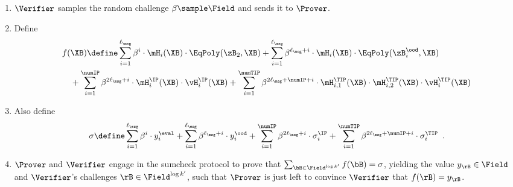 \begin{tcolorbox}[breakable, enhanced, colback=white, boxrule=0.65pt]
        \begin{enumerate}[nolistsep]
        \item $\Verifier$ samples the random challenge $\beta \sample \Field$ and sends it to $\Prover$.
        \item Define 
        \label{item:IOR-sumcheck-polynomial}
        \begin{align*}
            &f(\XB) \define \sum_{i=1}^{\ell_{\msg}} \beta^{i} \cdot \mH_i(\XB) \cdot \EqPoly(\zB_2, \XB) + \sum_{i=1}^{\ell_{\msg}} \beta^{\ell_{\msg} + i} \cdot \mH_i(\XB) \cdot \EqPoly(\zB^{\ood}_i, \XB) \\
            &\quad + \sum_{i=1}^{\numIP} \beta^{2\ell_{\msg} + i} \cdot \mH^{\IP}_i(\XB) \cdot \vH^{\IP}_i(\XB) + \sum_{i=1}^{\numTIP} \beta^{2\ell_{\msg} + \numIP + i} \cdot \mH^{\TIP}_{i,1}(\XB) \cdot \mH^{\TIP}_{i,2}(\XB) \cdot \vH^{\TIP}_i(\XB)
        \end{align*}
        \item Also define
        \label{item:IOR-sumcheck-value}
        \begin{align*}
            \sigma \define \sum_{i=1}^{\ell_{\msg}} \beta^{i} \cdot y^{\eval}_i + \sum_{i=1}^{\ell_{\msg}} \beta^{\ell_{\msg} + i} \cdot y^{\ood}_i + \sum_{i=1}^{\numIP} \beta^{2\ell_{\msg} + i} \cdot \sigma^{\IP}_i + \sum_{i=1}^{\numTIP} \beta^{2\ell_{\msg} + \numIP + i} \cdot \sigma^{\TIP}_i \enspace .
        \end{align*}
        \item $\Prover$ and $\Verifier$ engage in the sumcheck protocol to prove that $\sum_{\bB \in \Field^{\log k'}} f(\bB) = \sigma$, yielding the value $y_{\rB} \in \Field$ and $\Verifier$'s challenges $\rB \in \Field^{\log k'}$, such that $\Prover$ is just left to convince $\Verifier$ that $f(\rB) = y_{\rB}$.
        \end{enumerate}
        

\end{tcolorbox}
